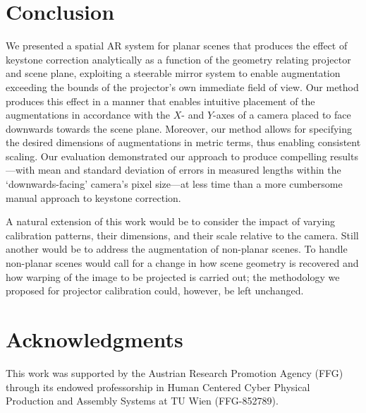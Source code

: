 \documentclass[review]{elsarticle}
\begin{document}
\section{Conclusion}

We presented a spatial AR system for planar scenes that produces the effect of keystone correction analytically as a function of the geometry relating projector and scene plane, exploiting a steerable mirror system to enable augmentation exceeding the bounds of the projector's own immediate field of view. Our method produces this effect in a manner that enables intuitive placement of the augmentations in accordance with the $X$- and $Y$-axes of a camera placed to face downwards towards the scene plane. Moreover, our method allows for specifying the desired dimensions of augmentations in metric terms, thus enabling consistent scaling. Our evaluation demonstrated our approach to produce compelling results---with mean and standard deviation of errors in measured lengths within the `downwards-facing' camera's pixel size---at less time than a more cumbersome manual approach to keystone correction.

A natural extension of this work would be to consider the impact of varying calibration patterns, their dimensions, and their scale relative to the camera. Still another would be to address the augmentation of non-planar scenes. To handle non-planar scenes would call for a change in how scene geometry is recovered and how warping of the image to be projected is carried out; the methodology we proposed for projector calibration could, however, be left unchanged.

\section{Acknowledgments}

This work was supported by the Austrian Research Promotion Agency (FFG) through its endowed professorship in Human Centered Cyber Physical Production and Assembly Systems at TU Wien (FFG-852789).


\end{document}
